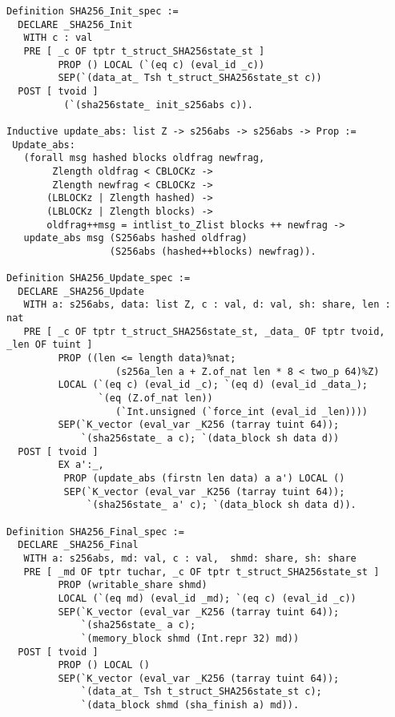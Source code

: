 \documentclass[prodmode,acmtoplas]{acmsmall}
\begin{document}
\begin{lstlisting}
Definition SHA256_Init_spec :=
  DECLARE _SHA256_Init
   WITH c : val 
   PRE [ _c OF tptr t_struct_SHA256state_st ]
         PROP () LOCAL (`(eq c) (eval_id _c))
         SEP(`(data_at_ Tsh t_struct_SHA256state_st c))
  POST [ tvoid ] 
          (`(sha256state_ init_s256abs c)).

Inductive update_abs: list Z -> s256abs -> s256abs -> Prop :=
 Update_abs:
   (forall msg hashed blocks oldfrag newfrag,
        Zlength oldfrag < CBLOCKz ->
        Zlength newfrag < CBLOCKz ->
       (LBLOCKz | Zlength hashed) ->
       (LBLOCKz | Zlength blocks) -> 
       oldfrag++msg = intlist_to_Zlist blocks ++ newfrag ->
   update_abs msg (S256abs hashed oldfrag) 
                  (S256abs (hashed++blocks) newfrag)).

Definition SHA256_Update_spec :=
  DECLARE _SHA256_Update
   WITH a: s256abs, data: list Z, c : val, d: val, sh: share, len : nat
   PRE [ _c OF tptr t_struct_SHA256state_st, _data_ OF tptr tvoid, _len OF tuint ]
         PROP ((len <= length data)%nat; 
                   (s256a_len a + Z.of_nat len * 8 < two_p 64)%Z)
         LOCAL (`(eq c) (eval_id _c); `(eq d) (eval_id _data_); 
                `(eq (Z.of_nat len))
                   (`Int.unsigned (`force_int (eval_id _len))))
         SEP(`K_vector (eval_var _K256 (tarray tuint 64));
             `(sha256state_ a c); `(data_block sh data d))
  POST [ tvoid ] 
         EX a':_, 
          PROP (update_abs (firstn len data) a a') LOCAL ()
          SEP(`K_vector (eval_var _K256 (tarray tuint 64));
              `(sha256state_ a' c); `(data_block sh data d)).

Definition SHA256_Final_spec :=
  DECLARE _SHA256_Final
   WITH a: s256abs, md: val, c : val,  shmd: share, sh: share
   PRE [ _md OF tptr tuchar, _c OF tptr t_struct_SHA256state_st ]
         PROP (writable_share shmd) 
         LOCAL (`(eq md) (eval_id _md); `(eq c) (eval_id _c))
         SEP(`K_vector (eval_var _K256 (tarray tuint 64));
             `(sha256state_ a c);
             `(memory_block shmd (Int.repr 32) md))
  POST [ tvoid ] 
         PROP () LOCAL ()
         SEP(`K_vector (eval_var _K256 (tarray tuint 64));
             `(data_at_ Tsh t_struct_SHA256state_st c);
             `(data_block shmd (sha_finish a) md)).
\end{lstlisting}
\end{document}
